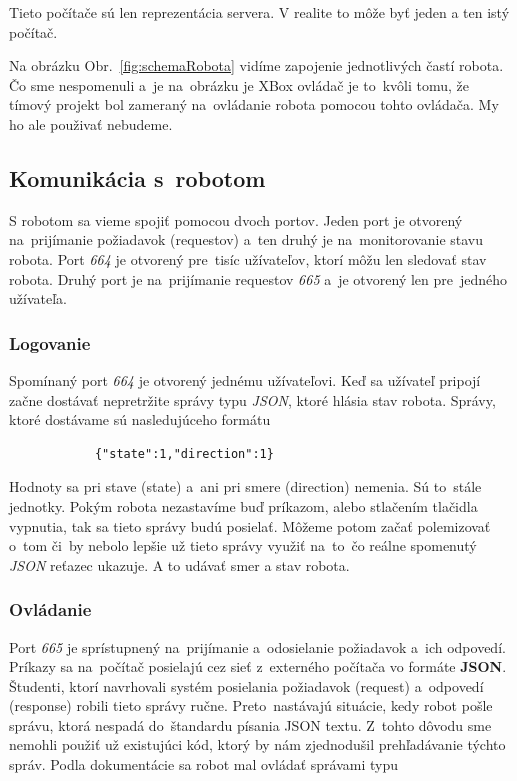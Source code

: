 \noindent Tieto počítače sú len reprezentácia servera. V realite to môže byť jeden a ten istý počítač.

\noindent Na obrázku Obr.~\ref{fig:schemaRobota} vidíme zapojenie jednotlivých častí robota. Čo sme nespomenuli a~je na~obrázku je XBox ovládač
je to~kvôli tomu, že tímový projekt bol zameraný na~ovládanie robota pomocou tohto ovládača. My ho ale použivať nebudeme.

\subsection{Komunikácia s~robotom}

S robotom sa vieme spojiť pomocou dvoch portov. Jeden port je otvorený na~prijímanie požiadavok (requestov) a~ten druhý je na~monitorovanie
stavu robota. Port \textit{664} je otvorený pre~tisíc užívateľov, ktorí môžu len sledovať stav robota. Druhý port je na~prijímanie requestov
\textit{665} a~je otvorený len pre~jedného užívateľa.

\subsubsection{Logovanie}

	Spomínaný port \textit{664} je otvorený jednému užívateľovi. Keď sa užívateľ pripojí začne dostávať nepretržite správy typu \textit{JSON},
	ktoré hlásia stav robota. Správy, ktoré dostávame sú nasledujúceho formátu

	\begin{lstlisting}
			{"state":1,"direction":1}
	\end{lstlisting}

	Hodnoty sa pri stave (state) a~ani pri smere (direction) nemenia. Sú to~stále jednotky. Pokým robota nezastavíme buď príkazom, alebo
	stlačením tlačidla vypnutia, tak sa tieto správy budú posielať. Môžeme potom začať polemizovať o~tom či~by nebolo lepšie už tieto správy
	využiť na~to~čo reálne spomenutý \textit{JSON} reťazec ukazuje. A to udávať smer a stav robota.

\subsubsection{Ovládanie}

	Port \textit{665} je sprístupnený na~prijímanie a~odosielanie požiadavok a~ich odpovedí. Príkazy sa na~počítač posielajú cez sieť z~externého
	počítača vo formáte \textbf{JSON}. Študenti, ktorí navrhovali systém posielania požiadavok (request) a~odpovedí (response) robili tieto správy
	ručne. Preto~nastávajú situácie, kedy robot pošle správu, ktorá nespadá do~štandardu písania JSON textu. Z~tohto dôvodu sme nemohli použiť už
	existujúci kód, ktorý by nám zjednodušil prehľadávanie týchto správ. Podla dokumentácie sa robot mal ovládať správami typu~\cite{BMdoc}

